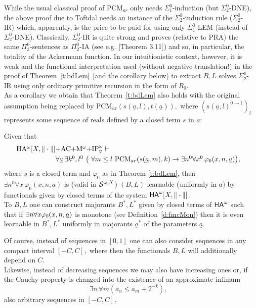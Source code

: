 While the usual classical proof of PCM$_{ar}$ only needs $\Sigma^0_1$-induction 
(but $\Sigma^0_2$-DNE), the above proof due to Toftdal needs an instance of 
the $\Sigma^0_2$-induction rule ($\Sigma^0_2$-IR) which, apparently, is the 
price to be paid for using only $\Sigma^0_1$-LEM (instead of 
$\Sigma^0_2$-DNE). Classically, $\Sigma^0_2$-IR is quite strong and proves 
(relative to PRA) the same $\Pi^0_3$-sentences as $\Pi^0_2$-IA 
(see e.g. \cite{Sieg}[Theorem 3.11]) and so, 
in particular, the totality of the Ackermann function. In our intuitionistic 
context, however, it is weak and the functional interpretation used 
(without negative translation!) in the 
proof of Theorem~\ref{t:bdLem} (and the corollary below) to extract $B,L$ solves 
$\Sigma^0_2$-IR using only ordinary primitive recursion in the form of 
$R_0.$ 
\\[2mm]
As a corollary we obtain that Theorem~\ref{t:bdLem} also holds with 
the original assumption being replaced by 
PCM$_{ar}(s(\underline{a},l),t(\underline{a})),$ where 
$(s(\underline{a},l)^{0\to 1})_l$ represents some sequence of reals defined by 
a closed term $s$ in $\underline{a}:$
\begin{cor} \label{cor.2.11}
Given that 
\[\ba{l} \mbox{\rm HA$^{\omega}[X,\|\cdot\|]+$AC$+$M$^{\omega}+
$IP}^{\omega}_{\forall}\vdash \\[1mm] \hspace*{2cm}  
\forall \underline{a}\,\exists k^0 ,l^0\ \big( 
\ \forall m \le l\ \mbox{\rm PCM}_{ar}(s(\underline{a},m),k)
 \rightarrow \exists n^0\forall x^0\,\varphi_0(x,n,\underline{a})\big), 
\ea \] 
where $s$ is a closed term and $\varphi_0$ as in Theorem \ref{t:bdLem}, then 
$\exists n^0\forall x\,\varphi_0(x,n,\underline{a})$ 
is (valid in ${\cal S}^{\omega,X}$) 
$(B,L)$-learnable (uniformly in $\underline{a}$) by functionals given by 
closed terms of the system $\ha[X,\|\cdot\|]$.\\
To $B,L$ one can construct majorants 
$B^*,L^*$ given by closed terms of $\ha$ such that 
if $\exists n\forall x \phi_0(x,n,\tup a)$ is monotone (see Definition~\ref{d:fmcMon}) then it is even learnable in $B^*,L^*$ uniformly in
majorants $\underline{a}^*$ of the parameters $\underline{a}$.
\end{cor}   
\begin{remark}
Of course, instead of sequences in $[0,1]$ one can also consider sequences 
in any compact interval $[-C,C],$ where then the functionals $B,L$ will 
additionally depend on $C.$ \\[1mm] Likewise, instead of decreasing 
sequences we may also have increasing ones or, if the Cauchy property 
is changed into the existence of an approximate infimum 
\[ \exists n\,\forall m (a_n\le a_m+2^{-k}), \] 
also arbitrary sequences in $[-C,C].$
\end{remark}

